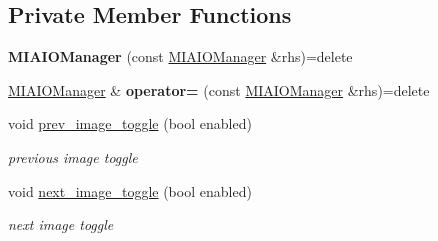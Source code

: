 \subsection*{Private Member Functions}
\begin{DoxyCompactItemize}
\item 
{\bfseries M\+I\+A\+I\+O\+Manager} (const \hyperlink{classimage__tools_1_1MIAIOManager}{M\+I\+A\+I\+O\+Manager} \&rhs)=delete\hypertarget{classimage__tools_1_1MIAIOManager_a4705d1544a60d8275803487ec9b17be8}{}\label{classimage__tools_1_1MIAIOManager_a4705d1544a60d8275803487ec9b17be8}

\item 
\hyperlink{classimage__tools_1_1MIAIOManager}{M\+I\+A\+I\+O\+Manager} \& {\bfseries operator=} (const \hyperlink{classimage__tools_1_1MIAIOManager}{M\+I\+A\+I\+O\+Manager} \&rhs)=delete\hypertarget{classimage__tools_1_1MIAIOManager_a9ab2095006589dda25bbf2a8d1aca39e}{}\label{classimage__tools_1_1MIAIOManager_a9ab2095006589dda25bbf2a8d1aca39e}

\item 
void \hyperlink{classimage__tools_1_1MIAIOManager_a87cd4108946bdf57ad6f2eedd545e30c}{prev\+\_\+image\+\_\+toggle} (bool enabled)\hypertarget{classimage__tools_1_1MIAIOManager_a87cd4108946bdf57ad6f2eedd545e30c}{}\label{classimage__tools_1_1MIAIOManager_a87cd4108946bdf57ad6f2eedd545e30c}

\begin{DoxyCompactList}\small\item\em previous image toggle \end{DoxyCompactList}\item 
void \hyperlink{classimage__tools_1_1MIAIOManager_a2b1effd6e28593276280f8665cd6c6b3}{next\+\_\+image\+\_\+toggle} (bool enabled)\hypertarget{classimage__tools_1_1MIAIOManager_a2b1effd6e28593276280f8665cd6c6b3}{}\label{classimage__tools_1_1MIAIOManager_a2b1effd6e28593276280f8665cd6c6b3}

\begin{DoxyCompactList}\small\item\em next image toggle \end{DoxyCompactList}\end{DoxyCompactItemize}
